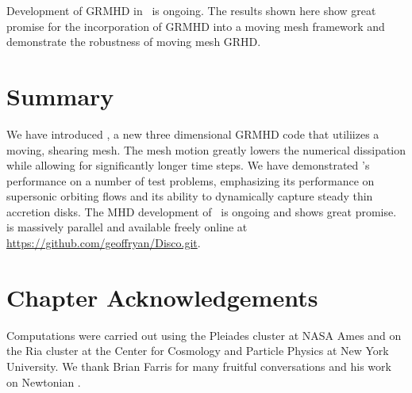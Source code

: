 Development of GRMHD in \grdisco\ is ongoing. The results shown here show great promise for the incorporation of GRMHD into a moving mesh framework and demonstrate the robustness of moving mesh GRHD.


\section{Summary}

We have introduced \grdisco, a new three dimensional GRMHD code that utiliizes a moving, shearing mesh.  The mesh motion greatly lowers the numerical dissipation while allowing for significantly longer time steps.  We have demonstrated \grdisco's performance on a number of test problems, emphasizing its performance on supersonic orbiting flows and its ability to dynamically capture steady thin accretion disks.  The MHD development of \grdisco\ is ongoing and shows great promise.  \grdisco is massively parallel and available freely online at \url{https://github.com/geoffryan/Disco.git}.

\section{Chapter Acknowledgements} 

Computations were carried out using the Pleiades cluster at NASA Ames and on the Ria cluster at the Center for Cosmology and Particle Physics at New York University. We thank Brian Farris for many fruitful conversations and his work on Newtonian \disco.

